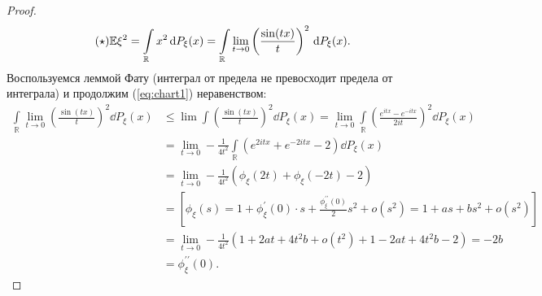 \begin{proof}
\begin{equation*}\label{eq:chart1}\tag{$\star$}
    \EE \xi^2 = \int\limits_\mathbb{R}x^2\dd P_\xi(x) = \int\limits_\mathbb{R} \underset{t\rightarrow 0}{\lim}\left(\frac{\sin(tx)}{t}\right)^2\dd P_\xi(x). 
\end{equation*}
Воспользуемся леммой Фату (интеграл от предела не превосходит предела от интеграла) и продолжим (\ref{eq:chart1}) неравенством:
   \begin{align*}
        \int\limits_\mathbb{R}\underset{t\rightarrow 0}{\lim}(\frac{\sin(tx)}{t})^2\dd P_\xi(x) &\le \lim\int (\frac{\sin(tx)}{t})^2\dd P_\xi(x)=
        \underset{t\rightarrow 0}{\lim} \int\limits_\mathbb{R} (\frac{e^{itx} - e^{-itx}}{2it})^2\dd P_\xi(x) \\&=
        \underset{t\rightarrow 0}{\lim} - \frac{1}{4t^2}\int\limits_\mathbb{R}(e^{2itx} +e^{-2itx} - 2) \dd P_\xi(x) \\&=
        \underset{t\rightarrow 0}{\lim}-\frac{1}{4t^2}(\phi_\xi(2t) + \phi_\xi(-2t) - 2) \\&= [\phi_\xi(s) = 1 + \phi_\xi ^ \prime(0)\cdot s + \frac{\phi_\xi^{\prime \prime}(0)}{2}s^2 + o(s^2) = 1 + as + bs^2 + o(s^2)] \\&= \underset{t\rightarrow 0}{\lim} -\frac{1}{4t^2}(1 + 2at + 4t^2 b + o(t^2) + 1 - 2at + 4t^2b - 2) = -2b \\&= \phi_\xi^{\prime \prime}(0).
   \end{align*}


\end{proof}
\newpage
